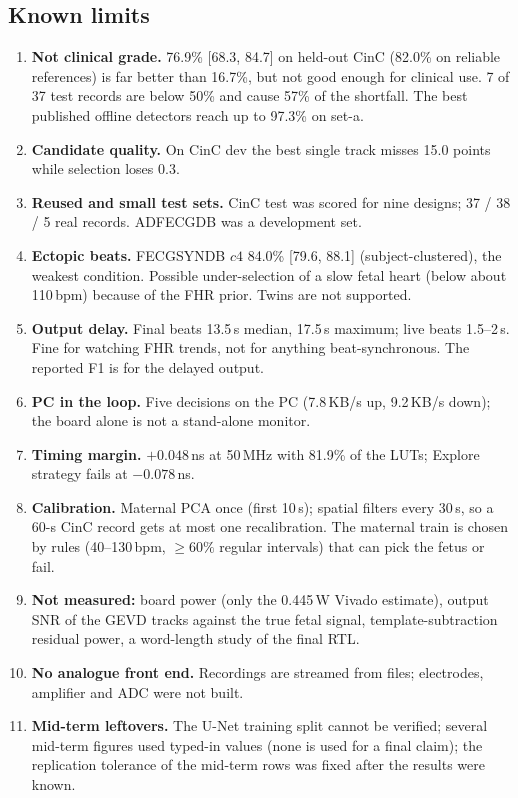 \documentclass[11pt]{article}
\begin{document}
\subsection{Known limits}
\begin{enumerate}
  \item \textbf{Not clinical grade.} 76.9\% [68.3, 84.7] on held-out CinC (82.0\% on reliable references) is far better than 16.7\%, but not good enough for clinical use. 7 of 37 test records are below 50\% and cause 57\% of the shortfall. The best published offline detectors reach up to 97.3\% on set-a.
  \item \textbf{Candidate quality.} On CinC dev the best single track misses 15.0 points while selection loses 0.3.
  \item \textbf{Reused and small test sets.} CinC test was scored for nine designs; 37 / 38 / 5 real records. ADFECGDB was a development set.
  \item \textbf{Ectopic beats.} FECGSYNDB $c4$ 84.0\% [79.6, 88.1] (subject-clustered), the weakest condition. Possible under-selection of a slow fetal heart (below about 110\,bpm) because of the FHR prior. Twins are not supported.
  \item \textbf{Output delay.} Final beats 13.5\,s median, 17.5\,s maximum; live beats 1.5--2\,s. Fine for watching FHR trends, not for anything beat-synchronous. The reported F1 is for the delayed output.
  \item \textbf{PC in the loop.} Five decisions on the PC (7.8\,KB/s up, 9.2\,KB/s down); the board alone is not a stand-alone monitor.
  \item \textbf{Timing margin.} $+0.048$\,ns at 50\,MHz with 81.9\% of the LUTs; Explore strategy fails at $-0.078$\,ns.
  \item \textbf{Calibration.} Maternal PCA once (first 10\,s); spatial filters every 30\,s, so a 60-s CinC record gets at most one recalibration. The maternal train is chosen by rules (40--130\,bpm, $\ge 60\%$ regular intervals) that can pick the fetus or fail.
  \item \textbf{Not measured:} board power (only the 0.445\,W Vivado estimate), output SNR of the GEVD tracks against the true fetal signal, template-subtraction residual power, a word-length study of the final RTL.
  \item \textbf{No analogue front end.} Recordings are streamed from files; electrodes, amplifier and ADC were not built.
  \item \textbf{Mid-term leftovers.} The U-Net training split cannot be verified; several mid-term figures used typed-in values (none is used for a final claim); the replication tolerance of the mid-term rows was fixed after the results were known.
\end{enumerate}
\end{document}
